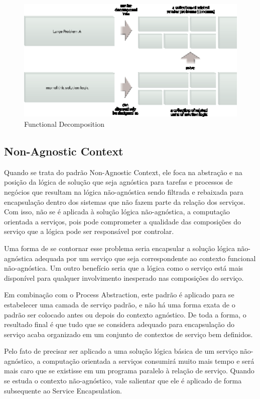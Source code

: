 \documentclass[12pt]{article}
\begin{document}
\begin{figure}[H]
\centering
\includegraphics[width=14cm]{img/fig3.eps}
\caption{Functional Decomposition}
\label{fig:3}
\end{figure}

\subsection{Non-Agnostic Context}

Quando se trata do padrão Non-Agnostic Context, ele foca na abstração e na posição da lógica de solução que seja agnóstica para tarefas e processos de negócios que resultam na lógica não-agnóstica sendo filtrada e rebaixada para encapsulação dentro dos sistemas que não fazem parte da relação dos serviços. Com isso, não se é aplicada à solução lógica não-agnóstica, a computação orientada a serviços, pois pode comprometer a qualidade das composições do serviço que a lógica pode ser responsável por controlar.

Uma forma de se contornar esse problema seria encapsular a solução lógica não-agnóstica adequada por um serviço que seja correspondente ao contexto funcional não-agnóstica. Um outro benefício seria que a lógica como o serviço está mais disponível para qualquer involvimento inesperado nas composições do serviço.

Em combinação com o Process Abstraction, este padrão é aplicado para se estabelecer uma camada de serviço padrão, e não há uma forma exata de o padrão ser colocado antes ou depois do contexto agnóstico. De toda a forma, o resultado final é que tudo que se considera adequado para encapsulação do serviço acaba organizado em um conjunto de contextos de serviço bem definidos.

Pelo fato de precisar ser aplicado a uma solução lógica básica de um serviço não-agnóstico, a computação orientada a serviços consumirá muito mais tempo e será mais caro que se existisse em um programa paralelo à relação de serviço. Quando se estuda o contexto não-agnóstico, vale salientar que ele é aplicado de forma subsequente ao Service Encapsulation.
\end{document}
